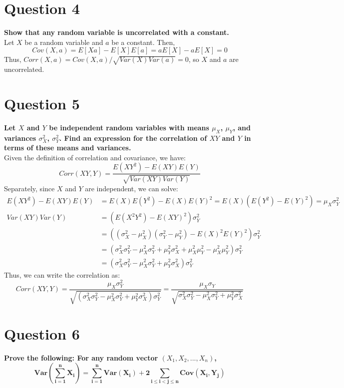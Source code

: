 \documentclass{article}
\begin{document}
\section*{Question 4}
\textbf{Show that any random variable is uncorrelated with a constant.}
\bigskip \\
Let $X$ be a random variable and $a$ be a constant. Then,
\[
	Cov(X,a) = E[Xa] - E[X]E[a] = aE[X] - aE[X] = 0
\]
Thus, $Corr(X,a) = Cov(X,a)/\sqrt{Var(X)Var(a)} = 0$, so $X$ and $a$ are uncorrelated.


\pagebreak
\section*{Question 5}
\textbf{Let $X$ and $Y$ be independent random variables with means $\mu_X$, $\mu_Y$, and variances $\sigma_X^2$, $\sigma^2_Y$. Find an expression for the correlation of $XY$ and $Y$ in terms of these means and variances.}
\bigskip \\
Given the definition of correlation and covariance, we have:
\[
	Corr(XY,Y) = \frac{E(XY^2)-E(XY)E(Y)}{\sqrt{Var(XY)Var(Y)}}
\]
Separately, since $X$ and $Y$ are independent, we can solve:
\begin{align*}
	E(XY^2)-E(XY)E(Y) 	&= E(X)E(Y^2) - E(X) E(Y)^2 = E(X)(E(Y^2) - E(Y)^2) = \mu_X\sigma_Y^2										\\
	Var(XY)Var(Y)		&= (E(X^2Y^2) - E(XY)^2)\sigma_Y^2 																			\\
						&= ((\sigma_X^2 - \mu_X^2)(\sigma_Y^2-\mu_Y^2) - E(X)^2E(Y)^2)\sigma_Y^2									\\
						&= (\sigma_X^2\sigma_Y^2 - \mu_X^2\sigma_Y^2+\mu_Y^2\sigma_X^2+\mu_X^2\mu_Y^2 - \mu_X^2\mu_Y^2)\sigma_Y^2	\\
						&= (\sigma_X^2\sigma_Y^2 - \mu_X^2\sigma_Y^2+\mu_Y^2\sigma_X^2)\sigma_Y^2
\end{align*}
Thus, we can write the correlation as:
\[
	Corr(XY,Y) 	= \frac{\mu_X\sigma_Y^2}{\sqrt{(\sigma_X^2\sigma_Y^2 - \mu_X^2\sigma_Y^2+\mu_Y^2\sigma_X^2)\sigma_Y^2}}
				= \frac{\mu_X\sigma_Y}{\sqrt{\sigma_X^2\sigma_Y^2 - \mu_X^2\sigma_Y^2+\mu_Y^2\sigma_X^2}}
\]


\section*{Question 6}
\textbf{Prove the following: For any random vector $(X_1,X_2,...,X_n)$,}
\[
	\mathbf{Var\left(\sum_{i=1}^n X_i \right) = \sum_{i=1}^n Var(X_i)+2 \sum_{i\leq i<j\leq n} Cov(X_i,Y_j)}
\]
\bigskip \\
\end{document}
